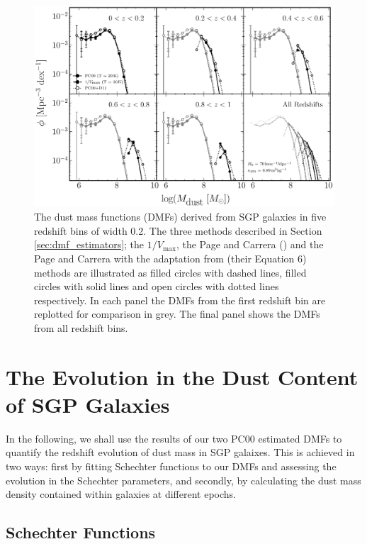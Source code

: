 \begin{figure}
	\centering
	\includegraphics[width=0.9\columnwidth]{Figures/dmf_methods.pdf}
	\caption[Dust mass functions derived from SGP galaxies]{The dust mass functions (DMFs) derived from SGP galaxies in five redshift bins of width 0.2. The three methods described in Section \ref{sec:dmf_estimators}; the $1/V_{\textrm{max}}$, the Page and Carrera (\citealt{Page_2000}) and the Page and Carrera with the adaptation from \citealt{Dunne_2011} (their Equation 6) methods are illustrated as filled circles with dashed lines, filled circles with solid lines and open circles with dotted lines respectively. In each panel the DMFs from the first redshift bin are replotted for comparison in grey. The final panel shows the DMFs from all redshift bins.}
	\label{fig:dmf_methods}
\end{figure}

\section{The Evolution in the Dust Content of SGP Galaxies}

In the following, we shall use the results of our two PC00 estimated DMFs to quantify the redshift evolution of dust mass in SGP galaixes. This is achieved in two ways: first by fitting Schechter functions to our DMFs and assessing the evolution in the Schechter parameters, and secondly, by calculating the dust mass density contained within galaxies at different epochs.

\subsection{Schechter Functions}
\label{sec:schechter_functions}


